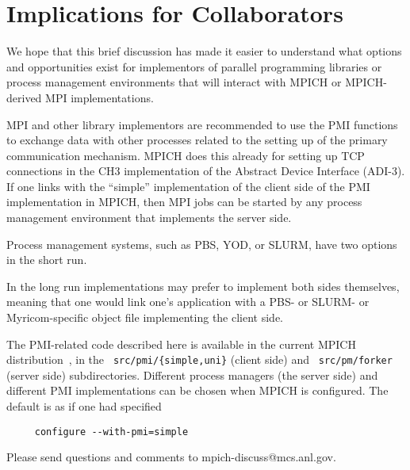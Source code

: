 \documentclass[11pt]{article}
\begin{document}
\section{Implications for Collaborators}
\label{sec:implications}

We hope that this brief discussion has made it easier to understand what
options and opportunities exist for implementors of parallel programming
libraries or process management environments that will interact with
MPICH or MPICH-derived MPI implementations.

MPI and other library implementors are recommended to use the PMI
functions to exchange data with other processes related to the setting
up of the primary communication mechanism.  MPICH does this already
for setting up TCP connections in the CH3 implementation of the
Abstract Device Interface (ADI-3).  If one links with the ``simple''
implementation of the client side of the PMI implementation in MPICH,
then MPI jobs can be started by any process management environment
that implements the server side.

Process management systems, such as PBS, YOD, or SLURM, have two options
in the short run.

In the long run implementations may prefer to implement both sides
themselves, meaning that one would link one's application with a PBS- or
SLURM- or Myricom-specific object file implementing the client side.

The PMI-related code described here is available in the current MPICH
distribution~\cite{mpich-web-page}, in the {\tt
  src/pmi/\{simple,uni\}} (client side) and {\tt
  src/pm/forker} (server side) subdirectories.
Different process managers (the server side) and different PMI
implementations can be chosen when MPICH is configured.  The default is
as if one had specified
\begin{verbatim}
     configure --with-pmi=simple
\end{verbatim}
Please send questions and comments to mpich-discuss@mcs.anl.gov.




\end{document}
